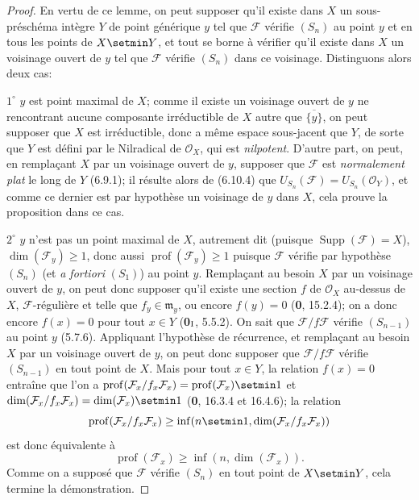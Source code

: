 \begin{proof}
En vertu de ce lemme, on peut supposer qu'il existe dans $X$ un
sous-préschéma intègre $Y$ de point générique $y$ tel que $\mathcal F$
vérifie $(S_n)$ au point $y$ et en tous les points de $X\setmin Y$, et tout se
borne à vérifier qu'il existe dans $X$ un voisinage ouvert de $y$ tel que
$\mathcal F$ vérifie $(S_n)$ dans ce voisinage. Distinguons alors deux cas:

$1^\circ$ $y$ est point maximal de $X$; comme il existe un voisinage ouvert
de $y$ ne rencontrant aucune composante irréductible de $X$ autre que
$\overline{\{y\}}$, on peut supposer que $X$ est irréductible, donc a même
espace sous-jacent que $Y$, de sorte que $Y$ est défini par le Nilradical de
$\mathcal O_X$, qui est \emph{nilpotent}. D'autre part, on peut, en remplaçant $X$
par un voisinage ouvert de $y$, supposer que $\mathcal F$ est \emph{normalement
plat} le long de $Y$ (6.9.1); il résulte alors de (6.10.4) que
$U_{S_n}(\mathcal F)=U_{S_n}(\mathcal O_Y)$, et comme ce dernier est par
hypothèse un voisinage de $y$ dans $X$, cela prouve la proposition dans ce
cas.


$2^\circ$ $y$ n'est pas un point maximal de $X$, autrement dit (puisque
$\operatorname{Supp}(\mathcal F)=X$), $\dim(\mathcal F_y)\geq1$, donc aussi
$\operatorname{prof}(\mathcal F_y)\geq1$ puisque $\mathcal F$ vérifie par
hypothèse $(S_n)$ (et \emph{a fortiori} $(S_1)$) au point $y$. Remplaçant au besoin
$X$ par un voisinage ouvert de $y$, on peut donc supposer qu'il existe une
section $f$ de $\mathcal O_X$ au-dessus de $X$, $\mathcal F$-régulière et
telle que $f_y\in\mathfrak m_y$, ou encore $f(y)=0$ (\textbf{0}, 15.2.4); on a donc
encore $f(x)=0$ pour tout $x\in Y$ (\textbf{0}$_{\rm I}$, 5.5.2). On sait que
$\mathcal F/f\mathcal F$ vérifie $(S_{n-1})$ au point $y$ (5.7.6).
Appliquant l'hypothèse de récurrence, et remplaçant au besoin $X$ par un
voisinage ouvert de $y$, on peut donc supposer que
$\mathcal F/f\mathcal F$ vérifie $(S_{n-1})$ en tout point de $X$. Mais pour
tout $x\in Y$, la relation $f(x)=0$ entraîne que l'on a
$\operatorname{prof}(\mathcal F_x/f_x\mathcal F_x)=
\operatorname{prof}(\mathcal F_x)\setmin 1$ et
$\dim(\mathcal F_x/f_x\mathcal F_x)=\dim(\mathcal F_x)\setmin 1$
(\textbf{0}, 16.3.4 et 16.4.6); la relation
\[
\operatorname{prof}(\mathcal F_x/f_x\mathcal F_x)\geq
\inf(n\setmin 1,\dim(\mathcal F_x/f_x\mathcal F_x))
\]
est donc équivalente à
\[
\operatorname{prof}(\mathcal F_x)\geq\inf(n,\dim(\mathcal F_x)).
\]
Comme on a supposé que $\mathcal F$ vérifie $(S_n)$ en tout point de $X\setmin Y$,
cela termine la démonstration.
\end{proof}

